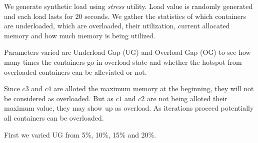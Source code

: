 \documentclass[a4paper, 11pt]{article}
\begin{document}
We generate synthetic load using \textit{stress} \cite{stress} utility. Load value is randomly generated and each load lasts for 20 seconds. We gather the statistics of which containers are underloaded, which are overloaded, their utilization, current allocated memory and how much memory is being utilized.

Parameters varied are Underload Gap (UG) and Overload Gap (OG) to see how many times the containers go in overload state and whether the hotspot from overloaded containers can be alleviated or not.

Since $c3$ and $c4$ are alloted the maximum memory at the beginning, they will not be considered as overloaded. But as $c1$ and $c2$ are not being alloted their maximum value, they may show up as overload. As iterations proceed potentially all containers can be overloaded.

First we varied UG from 5\%, 10\%, 15\% and 20\%. 
\end{document}
